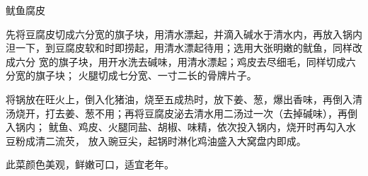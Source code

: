 %
%
%
%
%
%
%
\begin{recipe}{鱿鱼腐皮}

\ingredients


\preparation

\step 先将豆腐皮切成六分宽的旗子块，用清水漂起，并滴入碱水于清水内，再放入锅内
泹一下，到豆腐皮软和时即捞起，用清水漂起待用；选用大张明嫩的鱿鱼，同样改成六分
宽的旗子块，用开水洗去碱味，用清水漂起；鸡皮去尽细毛，同样切成六分宽的旗子块；
火腿切成七分宽、一寸二长的骨牌片子。

\step 将锅放在旺火上，倒入化猪油，烧至五成热时，放下姜、葱，爆出香味，再倒入清
汤烧开，打去姜、葱不用；再将豆腐皮泌去清水用二汤过一次（去掉碱味），再倒入锅内；
鱿鱼、鸡皮、火腿同盐、胡椒、味精，依次投入锅内，烧开时再勾入水豆粉成清二流芡，
放入豌豆尖，起锅时淋化鸡油盛入大窝盘内即成。

\features

此菜颜色美观，鲜嫩可口，适宜老年。

\end{recipe}

